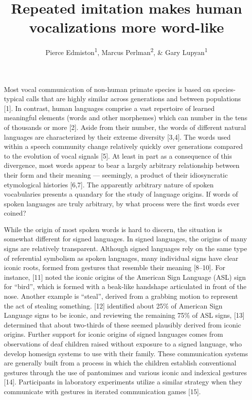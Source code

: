 \documentclass[english,floatsintext,man]{apa6}
\title{Repeated imitation makes human vocalizations more word-like}
\author{Pierce Edmiston\textsuperscript{1}, Marcus Perlman\textsuperscript{2}, \& Gary Lupyan\textsuperscript{1}}
\affiliation{
    \vspace{0.5cm}
          \textsuperscript{1} University of Wisconsin-Madison\\
          \textsuperscript{2} University of Birmingham  }
\theoremstyle{definition}
\theoremstyle{definition}
\theoremstyle{definition}
\theoremstyle{remark}
\begin{document}
\maketitle

\setcounter{secnumdepth}{0}



Most vocal communication of non-human primate species is based on
species-typical calls that are highly similar across generations and
between populations {[}1{]}. In contrast, human languages comprise a
vast repertoire of learned meaningful elements (words and other
morphemes) which can number in the tens of thousands or more {[}2{]}.
Aside from their number, the words of different natural languages are
characterized by their extreme diversity {[}3,4{]}. The words used
within a speech community change relatively quickly over generations
compared to the evolution of vocal signals {[}5{]}. At least in part as
a consequence of this divergence, most words appear to bear a largely
arbitrary relationship between their form and their meaning ---
seemingly, a product of their idiosyncratic etymological histories
{[}6,7{]}. The apparently arbitrary nature of spoken vocabularies
presents a quandary for the study of language origins. If words of
spoken languages are truly arbitrary, by what process were the first
words ever coined?

While the origin of most spoken words is hard to discern, the situation
is somewhat different for signed languages. In signed languages, the
origins of many signs are relatively transparent. Although signed
languages rely on the same type of referential symbolism as spoken
languages, many individual signs have clear iconic roots, formed from
gestures that resemble their meaning {[}8--10{]}. For instance, {[}11{]}
noted the iconic origins of the American Sign Language (ASL) sign for
\enquote{bird}, which is formed with a beak-like handshape articulated
in front of the nose. Another example is \enquote{steal}, derived from a
grabbing motion to represent the act of stealing something. {[}12{]}
identified about 25\% of American Sign Language signs to be iconic, and
reviewing the remaining 75\% of ASL signs, {[}13{]} determined that
about two-thirds of these seemed plausibly derived from iconic origins.
Further support for iconic origins of signed languages comes from
observations of deaf children raised without exposure to a signed
language, who develop homesign systems to use with their family. These
communication systems are generally built from a process in which the
children establish conventional gestures through the use of pantomimes
and various iconic and indexical gestures {[}14{]}. Participants in
laboratory experiments utilize a similar strategy when they communicate
with gestures in iterated communication games {[}15{]}.
\end{document}
